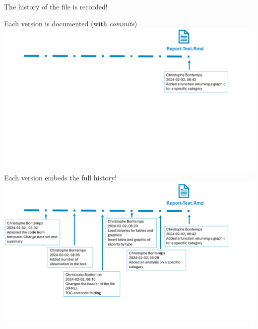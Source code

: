 \documentclass[xcolor=x11names,compress, aspectratio=169]{beamer}
\renewcommand{\(}{\begin{columns}}
\renewcommand{\)}{\end{columns}}
\newcommand{\<}[1]{\begin{column}{#1}}
\renewcommand{\>}{\end{column}}
\begin{document}
\begin{frame}{The history of the file is recorded!}
\begin{center}
\begin{itemize}
    {Each version is documented (with \emph{commits}) \\ }
    {\includegraphics[width = 1.0\textwidth]{FileLifeHistoryEnd.png} \\ }
    {Each version embeds the full history!  }
    {\includegraphics[width = 1.0\textwidth]{FileLifeHistoryFull.png} \\ }
\end{itemize}
\end{center}
\end{frame}
\end{document}
